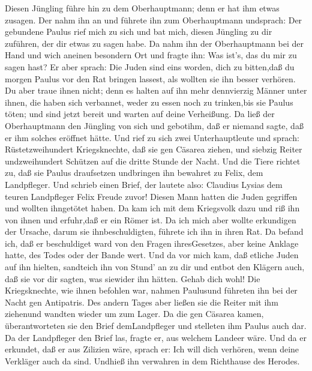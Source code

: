 Diesen Jüngling führe hin zu dem Oberhauptmann; denn er hat ihm etwas
zusagen.  Der nahm ihn an und führete ihn zum Oberhauptmann
undsprach: Der gebundene Paulus rief mich zu sich und bat mich, diesen
Jüngling zu dir zuführen, der dir etwas zu sagen habe.  Da
nahm ihn der Oberhauptmann bei der Hand und wich aneinen besondern Ort
und fragte ihn: Was ist's, das du mir zu sagen hast?  Er
aber sprach: Die Juden sind eins worden, dich zu bitten,daß du morgen
Paulus vor den Rat bringen lassest, als wollten sie ihn besser verhören.
 Du aber traue ihnen nicht; denn es halten auf ihn mehr
dennvierzig Männer unter ihnen, die haben sich verbannet, weder zu essen
noch zu trinken,bis sie Paulus töten; und sind jetzt bereit und warten
auf deine Verheißung.  Da ließ der Oberhauptmann den
Jüngling von sich und gebotihm, daß er niemand sagte, daß er ihm solches
eröffnet hätte.  Und rief zu sich zwei Unterhauptleute und
sprach: Rüstetzweihundert Kriegsknechte, daß sie gen Cäsarea ziehen, und
siebzig Reiter undzweihundert Schützen auf die dritte Stunde der Nacht.
 Und die Tiere richtet zu, daß sie Paulus draufsetzen
undbringen ihn bewahret zu Felix, dem Landpfleger.  Und
schrieb einen Brief, der lautete also:  Claudius Lysias dem
teuren Landpfleger Felix Freude zuvor!  Diesen Mann hatten
die Juden gegriffen und wollten ihngetötet haben. Da kam ich mit dem
Kriegsvolk dazu und riß ihn von ihnen und erfuhr,daß er ein Römer ist.
 Da ich mich aber wollte erkundigen der Ursache, darum sie
ihnbeschuldigten, führete ich ihn in ihren Rat.  Da befand
ich, daß er beschuldiget ward von den Fragen ihresGesetzes, aber keine
Anklage hatte, des Todes oder der Bande wert.  Und da vor
mich kam, daß etliche Juden auf ihn hielten, sandteich ihn von Stund' an
zu dir und entbot den Klägern auch, daß sie vor dir sagten, was siewider
ihn hätten. Gehab dich wohl!  Die Kriegsknechte, wie ihnen
befohlen war, nahmen Paulusund führeten ihn bei der Nacht gen
Antipatris.  Des andern Tages aber ließen sie die Reiter
mit ihm ziehenund wandten wieder um zum Lager.  Da die gen
Cäsarea kamen, überantworteten sie den Brief demLandpfleger und
stelleten ihm Paulus auch dar.  Da der Landpfleger den
Brief las, fragte er, aus welchem Landeer wäre. Und da er erkundet, daß
er aus Zilizien wäre, sprach er:  Ich will dich verhören,
wenn deine Verkläger auch da sind. Undhieß ihn verwahren in dem
Richthause des Herodes.

